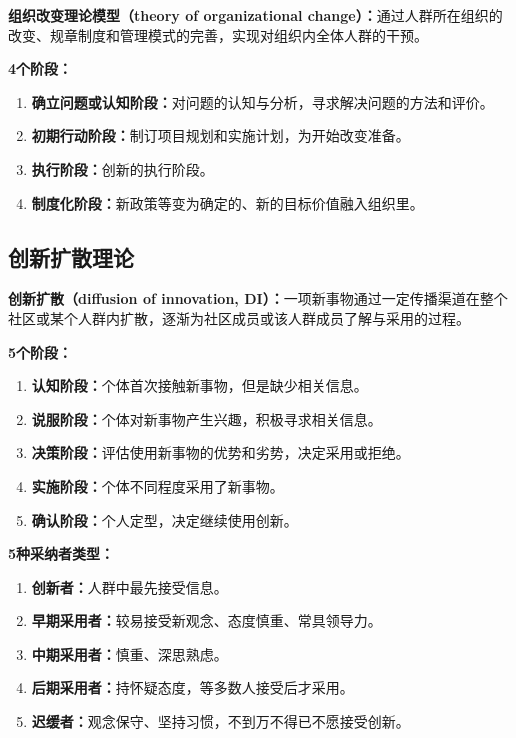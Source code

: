 \begin{keybox}
\textbf{组织改变理论模型（theory of organizational change）：}通过人群所在组织的改变、规章制度和管理模式的完善，实现对组织内全体人群的干预。

\textbf{4个阶段：}

\begin{enumerate}[leftmargin=*]
    \item \textbf{确立问题或认知阶段：}对问题的认知与分析，寻求解决问题的方法和评价。
    \item \textbf{初期行动阶段：}制订项目规划和实施计划，为开始改变准备。
    \item \textbf{执行阶段：}创新的执行阶段。
    \item \textbf{制度化阶段：}新政策等变为确定的、新的目标价值融入组织里。
\end{enumerate}
\end{keybox}

\subsection{创新扩散理论}

\begin{keybox}
\textbf{创新扩散（diffusion of innovation, DI）：}一项新事物通过一定传播渠道在整个社区或某个人群内扩散，逐渐为社区成员或该人群成员了解与采用的过程。

\textbf{5个阶段：}

\begin{enumerate}[leftmargin=*]
    \item \textbf{认知阶段：}个体首次接触新事物，但是缺少相关信息。
    \item \textbf{说服阶段：}个体对新事物产生兴趣，积极寻求相关信息。
    \item \textbf{决策阶段：}评估使用新事物的优势和劣势，决定采用或拒绝。
    \item \textbf{实施阶段：}个体不同程度采用了新事物。
    \item \textbf{确认阶段：}个人定型，决定继续使用创新。
\end{enumerate}

\textbf{5种采纳者类型：}

\begin{enumerate}[leftmargin=*]
    \item \textbf{创新者：}人群中最先接受信息。
    \item \textbf{早期采用者：}较易接受新观念、态度慎重、常具领导力。
    \item \textbf{中期采用者：}慎重、深思熟虑。
    \item \textbf{后期采用者：}持怀疑态度，等多数人接受后才采用。
    \item \textbf{迟缓者：}观念保守、坚持习惯，不到万不得已不愿接受创新。
\end{enumerate}
\end{keybox}

